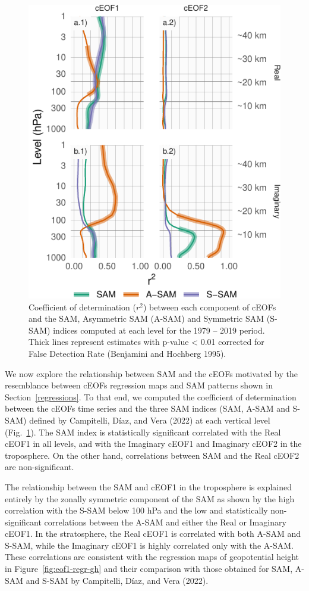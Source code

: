 \documentclass[smallextended]{svjour3}       %
\begin{document}
\begin{figure}
\centering
\includegraphics{../figures/sam-eof-vertical-1.pdf}
\caption{\label{fig:sam-eof-vertical}Coefficient of determination (\(r^2\)) between each component of cEOFs and the SAM, Asymmetric SAM (A-SAM) and Symmetric SAM (S-SAM) indices computed at each level for the 1979 -- 2019 period. Thick lines represent estimates with p-value \textless{} 0.01 corrected for False Detection Rate (Benjamini and Hochberg 1995).}
\end{figure}

We now explore the relationship between SAM and the cEOFs motivated by the resemblance between cEOFs regression maps and SAM patterns shown in Section~\ref{regressions}.
To that end, we computed the coefficient of determination between the cEOFs time series and the three SAM indices (SAM, A-SAM and S-SAM) defined by Campitelli, Díaz, and Vera (2022) at each vertical level (Fig.~\ref{fig:sam-eof-vertical}).
The SAM index is statistically significant correlated with the Real cEOF1 in all levels, and with the Imaginary cEOF1 and Imaginary cEOF2 in the troposphere.
On the other hand, correlations between SAM and the Real cEOF2 are non-significant.

The relationship between the SAM and cEOF1 in the troposphere is explained entirely by the zonally symmetric component of the SAM as shown by the high correlation with the S-SAM below 100 hPa and the low and statistically non-significant correlations between the A-SAM and either the Real or Imaginary cEOF1.
In the stratosphere, the Real cEOF1 is correlated with both A-SAM and S-SAM, while the Imaginary cEOF1 is highly correlated only with the A-SAM.
These correlations are consistent with the regression maps of geopotential height in Figure~\ref{fig:eof1-regr-gh} and their comparison with those obtained for SAM, A-SAM and S-SAM by Campitelli, Díaz, and Vera (2022).
\end{document}
